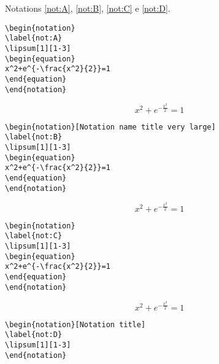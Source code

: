 Notations \ref{not:A}, \ref{not:B}, \ref{not:C} e \ref{not:D}.

\begin{verbatim}
\begin{notation}
\label{not:A}
\lipsum[1][1-3]
\begin{equation}
x^2+e^{-\frac{x^2}{2}}=1
\end{equation}
\end{notation}
\end{verbatim}
\begin{notation}
\label{not:A}
\lipsum[1][1-3]
\begin{equation}
x^2+e^{-\frac{x^2}{2}}=1
\end{equation}
\end{notation}

\begin{verbatim}
\begin{notation}[Notation name title very large]
\label{not:B}
\lipsum[1][1-3]
\begin{equation}
x^2+e^{-\frac{x^2}{2}}=1
\end{equation}
\end{notation}
\end{verbatim}
\begin{notation}
\label{not:B}
\lipsum[1][1-3]
\begin{equation}
x^2+e^{-\frac{x^2}{2}}=1
\end{equation}
\end{notation}

\begin{verbatim}
\begin{notation}
\label{not:C}
\lipsum[1][1-3]
\begin{equation}
x^2+e^{-\frac{x^2}{2}}=1
\end{equation}
\end{notation}
\end{verbatim}
\begin{notation}
\label{not:C}
\lipsum[1][1-3]
\begin{equation}
x^2+e^{-\frac{x^2}{2}}=1
\end{equation}
\end{notation}

\begin{verbatim}
\begin{notation}[Notation title]
\label{not:D}
\lipsum[1][1-3]
\end{notation}
\end{verbatim}
\begin{notation}
\label{not:D}
\lipsum[1][1-3]
\end{notation}

